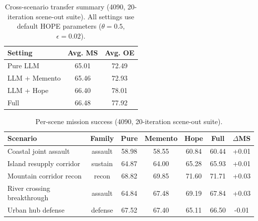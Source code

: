 \begin{table}[ht]
\centering
\caption{Cross-scenario transfer summary (4090, 20-iteration scene-out suite). All settings use default HOPE parameters ($\theta=0.5$, $\epsilon=0.02$).}
\label{tab:generalization-summary}
\small
\begin{tabular}{lcc}
\toprule
Setting & Avg. MS & Avg. OE \\
\midrule
Pure LLM & 65.01 & 72.49 \\
LLM + Memento & 65.46 & 72.93 \\
LLM + Hope & 66.40 & 78.01 \\
Full & 66.48 & 77.92 \\
\bottomrule
\end{tabular}
\end{table}

\begin{table}[ht]
\centering
\caption{Per-scene mission success (4090, 20-iteration scene-out suite).}
\label{tab:generalization-scenes}
\small
\setlength{\tabcolsep}{4pt}
\begin{tabular}{lcccccc}
\toprule
Scenario & Family & Pure & Memento & Hope & Full & $\Delta$MS \\
\midrule
Coastal joint assault & assault & 58.98 & 58.55 & 60.84 & 60.44 & +0.01 \\
Island resupply corridor & sustain & 64.87 & 64.00 & 65.28 & 65.93 & +0.01 \\
Mountain corridor recon & recon & 68.82 & 69.85 & 71.60 & 71.71 & +0.03 \\
River crossing breakthrough & assault & 64.84 & 67.48 & 69.19 & 67.84 & +0.03 \\
Urban hub defense & defense & 67.52 & 67.40 & 65.11 & 66.50 & -0.01 \\
\bottomrule
\end{tabular}
\end{table}



